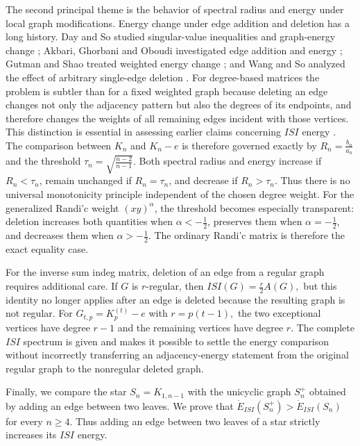 \documentclass[12pt,twoside]{article}
\begin{document}
The second principal theme is the behavior of spectral radius and energy under local graph modifications. Energy change under edge addition and deletion has a long history. Day and So studied singular-value inequalities and graph-energy change \cite{day,day2}; Akbari, Ghorbani and Oboudi investigated edge addition and energy \cite{akbari}; Gutman and Shao treated weighted energy change \cite{gs}; and Wang and So analyzed the effect of arbitrary single-edge deletion \cite{wang}. For degree-based matrices the problem is subtler than for a fixed weighted graph because deleting an edge changes not only the adjacency pattern but also the degrees of its endpoints, and therefore changes the weights of all remaining edges incident with those vertices. This distinction is essential in assessing earlier claims concerning $ISI$ energy \cite{bilalpak}.
The comparison between $K_n$ and $K_n-e$ is therefore governed exactly by
$
R_n=\tfrac{b_n}{a_n}
$
and the threshold
$
\tau_n=\sqrt{\tfrac{n-2}{n-1}}.
$
Both spectral radius and energy increase if $R_n<\tau_n$, remain unchanged if $R_n=\tau_n$, and decrease if $R_n>\tau_n$. Thus there is no universal monotonicity principle independent of the chosen degree weight. For the generalized Randi'c weight $(xy)^{\alpha}$, the threshold becomes especially transparent: deletion increases both quantities when $\alpha<-\tfrac12$, preserves them when $\alpha=-\tfrac12$, and decreases them when $\alpha>-\tfrac12$. The ordinary Randi'c matrix is therefore the exact equality case.

For the inverse sum indeg matrix, deletion of an edge from a regular graph requires additional care. If $G$ is $r$-regular, then
$
ISI(G)=\frac r2A(G),
$
but this identity no longer applies after an edge is deleted because the resulting graph is not regular. For
$
G_{t,p}=K_p^{(t)}-e
$
with
$
r=p(t-1),
$
the two exceptional vertices have degree $r-1$ and the remaining vertices have degree $r$.  The complete $ISI$ spectrum is given and makes it possible to settle the energy comparison without incorrectly transferring an adjacency-energy statement from the original regular graph to the nonregular deleted graph.

Finally, we compare the star
$
S_n=K_{1,n-1}
$
with the unicyclic graph $S_n^+$ obtained by adding an edge between two leaves. We prove that
$
\dot E_{ISI}(S_n^+)>\dot E_{ISI}(S_n)
$
for every $n\geq4$. Thus adding an edge between two leaves of a star strictly increases its $ISI$ energy.

 
	
\end{document}
